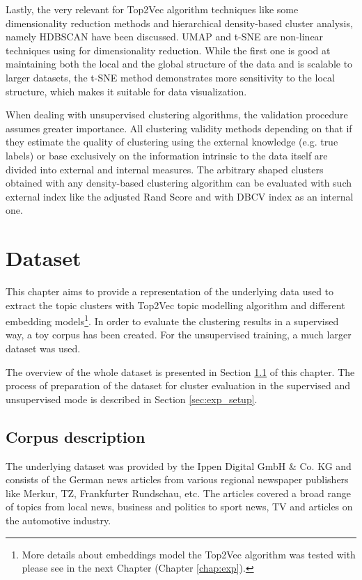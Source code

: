 \documentclass[fontsize=12pt,a4paper,twoside,openany]{scrbook}
\begin{document}
Lastly, the very relevant for Top2Vec algorithm techniques like some dimensionality reduction methods and hierarchical density-based cluster analysis, namely HDBSCAN have been discussed. UMAP and t-SNE are non-linear techniques using for dimensionality reduction. While the first one is good at maintaining both the local and the global structure of the data and is scalable to larger datasets, the t-SNE method demonstrates more sensitivity to the local structure, which makes it suitable for data visualization. 

When dealing with unsupervised clustering algorithms, the validation procedure assumes greater importance. All clustering validity methods depending on that if they estimate the quality of clustering using the external knowledge (e.g. true labels) or base exclusively on the information intrinsic to the data itself are divided into external and internal measures. The arbitrary shaped clusters obtained with any density-based clustering algorithm can be evaluated with such external index like the adjusted Rand Score and with DBCV index as an internal one.

\chapter{Dataset}
\label{chap:dataset}
This chapter aims to provide a representation of the underlying data used to extract the topic clusters with Top2Vec topic modelling algorithm and different embedding models\footnote{More details about embeddings model the Top2Vec algorithm was tested with please see in the next Chapter (Chapter \ref{chap:exp}).}. In order to evaluate the clustering results in a supervised way, a toy corpus has been created. For the unsupervised training, a much larger dataset was used. 

The overview of the whole dataset is presented in Section \ref{sec:corp_exploration} of this chapter. The process of preparation of the dataset for cluster evaluation in the supervised and unsupervised mode is described in Section \ref{sec:exp_setup}.

\section{Corpus description}
\label{sec:corp_exploration}

The underlying dataset was provided by the Ippen Digital GmbH \& Co. KG and consists of the German news articles from various regional newspaper publishers like Merkur, TZ, Frankfurter Rundschau, etc. The articles covered a broad range of topics from local news, business and politics to sport news, TV and articles on the automotive industry.
\end{document}
